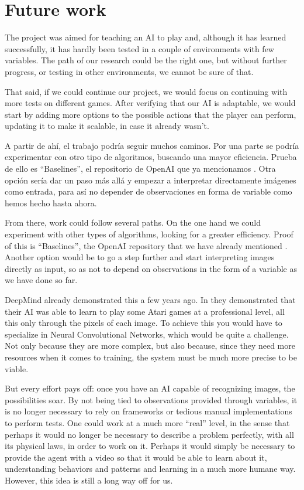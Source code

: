 \section{Future work}

The project was aimed for teaching an AI to play and, although it has learned successfully, it has hardly been tested in a couple of environments with few variables. The path of our research could be the right one, but without further progress, or testing in other environments, we cannot be sure of that.

That said, if we could continue our project, we would focus on continuing with more tests on different games. After verifying that our AI is adaptable, we would start by adding more options to the possible actions that the player can perform, updating it to make it scalable, in case it already wasn't.

A partir de ahí, el trabajo podría seguir muchos caminos. Por una parte se podría experimentar con otro tipo de algoritmos, buscando una mayor eficiencia. Prueba de ello es ``Baselines'', el repositorio de OpenAI que ya mencionamos \citep{baselines}. Otra opción sería dar un paso más allá y empezar a interpretar directamente imágenes como entrada, para así no depender de observaciones en forma de variable como hemos hecho hasta ahora.

From there, work could follow several paths. On the one hand we could experiment with other types of algorithms, looking for a greater efficiency. Proof of this is ``Baselines'', the OpenAI repository that we have already mentioned \citep{baselines}. Another option would be to go a step further and start interpreting images directly as input, so as not to depend on observations in the form of a variable as we have done so far.

DeepMind already demonstrated this a few years ago. In \citet{mnih2013playing} they demonstrated that their AI was able to learn to play some Atari games at a professional level, all this only through the pixels of each image. To achieve this you would have to specialize in Neural Convolutional Networks, which would be quite a challenge. Not only because they are more complex, but also because, since they need more resources when it comes to training, the system must be much more precise to be viable.

But every effort pays off: once you have an AI capable of recognizing images, the possibilities soar. By not being tied to observations provided through variables, it is no longer necessary to rely on frameworks or tedious manual implementations to perform tests. One could work at a much more ``real'' level, in the sense that perhaps it would no longer be necessary to describe a problem perfectly, with all its physical laws, in order to work on it. Perhaps it would simply be necessary to provide the agent with a video so that it would be able to learn about it, understanding behaviors and patterns and learning in a much more humane way. However, this idea is still a long way off for us.

